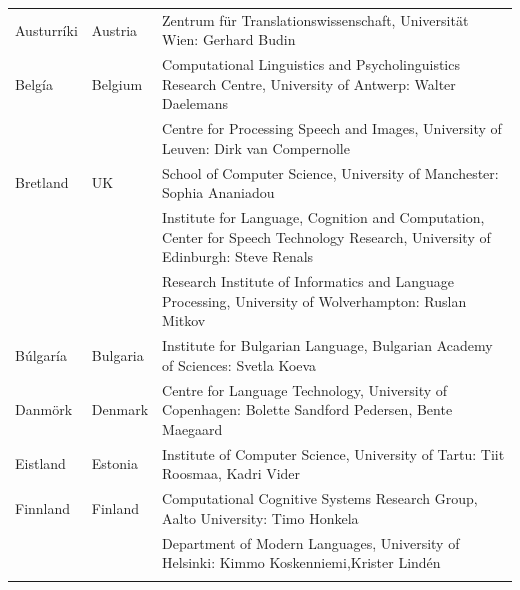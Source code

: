 \documentclass{../../metanetpaper}
\begin{document}
\cleardoublepage

\appendix
{}



  
\cleardoublepage

\label{metanetmembers}

\small
\begin{longtable}{llp{105mm}}
 Austurríki & \textcolor{grey1}{Austria} & Zentrum für Translationswissenschaft, Universität Wien: Gerhard Budin\\ \addlinespace 
  Belgía & \textcolor{grey1}{Belgium} & Computational Linguistics and Psycholinguistics Research Centre, University of Antwerp: Walter Daelemans\\ \addlinespace
  & & Centre for Processing Speech and Images, University of Leuven: Dirk van Compernolle \\ \addlinespace
  Bretland & \textcolor{grey1}{UK} & 
  School of Computer Science, University of Manchester: Sophia Ananiadou \\ \addlinespace 
  & & Institute for Language, Cognition and Computation, Center for Speech Technology Research, University of Edinburgh: Steve Renals \\ \addlinespace 
  & & Research Institute of Informatics and Language Processing, University of Wolverhampton: Ruslan Mitkov \\ \addlinespace 
  Búlgaría & \textcolor{grey1}{Bulgaria} & Institute for Bulgarian Language, Bulgarian Academy of Sciences: Svetla Koeva \\ \addlinespace
  Danmörk &  \textcolor{grey1}{Denmark} & Centre for Language Technology, University of Copenhagen: \newline Bolette Sandford Pedersen, Bente Maegaard\\ \addlinespace
  Eistland & \textcolor{grey1}{Estonia} & Institute of Computer Science, University of Tartu: Tiit Roosmaa, Kadri Vider\\ \addlinespace
  Finnland & \textcolor{grey1}{Finland} & Computational Cognitive Systems Research Group, Aalto University: Timo Honkela\\ \addlinespace
  & & Department of Modern Languages, University of Helsinki: Kimmo Koskenniemi,\newline Krister Lindén \\ \addlinespace

\end{longtable}
\end{document}

